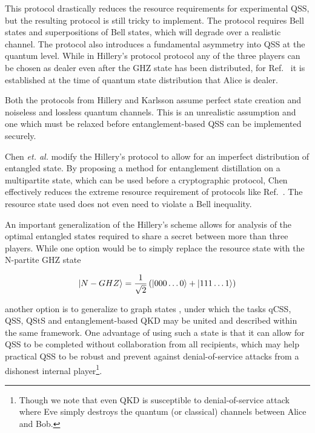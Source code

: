 This protocol drastically reduces the resource requirements for experimental QSS, but the resulting protocol is still tricky to implement. The protocol requires Bell states and superpositions of Bell states, which will degrade over a realistic channel.  The protocol also introduces a fundamental asymmetry into QSS at the quantum level. While in Hillery's protocol protocol any of the three players can be chosen as dealer even after the GHZ state has been distributed, for Ref.~\cite{Karlsson1999} it is established at the time of quantum state distribution that Alice is dealer. %

Both the protocols from Hillery \cite{Hillery1999} and Karlsson \cite{Karlsson1999} assume perfect state creation and noiseless and lossless quantum channels. This is an unrealistic assumption and one which must be relaxed before entanglement-based QSS can be implemented securely. 

Chen \emph{et. al.} \cite{Chen2005a} modify the Hillery's protocol \cite{Hillery1999} to allow for an imperfect distribution of entangled state. By proposing a method for entanglement distillation on a multipartite state, which can be used before a cryptographic protocol, Chen effectively reduces the extreme resource requirement of protocols like Ref.~\cite{Hillery1999}. The resource state used does not even need to violate a Bell inequality.

An important generalization of the Hillery's scheme allows for analysis of the optimal entangled states required to share a secret between more than three players. While one option would be to simply replace the resource state with the N-partite GHZ state

\begin{equation}
\ket{N-GHZ} = \frac{1}{\sqrt{2}}\left(\ket{000\dots0} + \ket{111\dots1} \right)
\end{equation}

\noindent another option is to generalize to graph states \cite{Markham2008, Keet2010, Lau2013, Wu2016}, under which the tasks qCSS, QSS, QStS and entanglement-based QKD may be united and described within the same framework. %
One advantage of using such a state is that it can allow for QSS to be completed without collaboration from all recipients, which may help practical QSS to be robust and prevent against denial-of-service attacks from a dishonest internal player\footnote{Though we note that even QKD is susceptible to denial-of-service attack where Eve simply destroys the quantum (or classical) channels between Alice and Bob.}.

